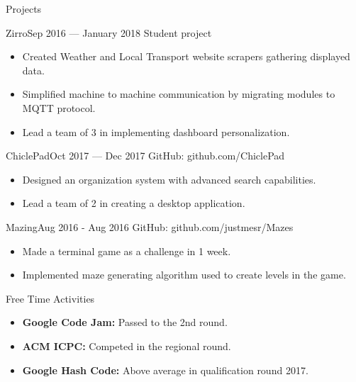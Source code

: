\documentclass[]{style}
\begin{document}
	\begin{cvsection}{Projects}
		\begin{cvsubsection}{Zirro}{}{Sep 2016 — January 2018}
			Student project
			\begin{itemize}
				\item Created Weather and Local Transport website scrapers gathering displayed data.
				\item Simplified machine to machine communication by migrating modules to MQTT protocol.
				\item Lead a team of 3 in implementing dashboard personalization.
			\end{itemize}
		\end{cvsubsection}

		\begin{cvsubsection}{ChiclePad}{}{Oct 2017 — Dec 2017}
			GitHub: github.com/ChiclePad
			\begin{itemize}
				\item Designed an organization system with advanced search capabilities.
				\item Lead a team of 2 in creating a desktop application.
			\end{itemize}
		\end{cvsubsection}

		\begin{cvsubsection}{Mazing}{}{Aug 2016 - Aug 2016}
			GitHub: github.com/justmesr/Mazes
			\begin{itemize}
				\item Made a terminal game as a challenge in 1 week.
				\item Implemented maze generating algorithm used to create levels in the game. 
			\end{itemize}
		\end{cvsubsection}
	\end{cvsection}
	
	\begin{cvsection}{Free Time Activities}
		\begin{cvsubsection}{}{}{}	
			\begin{itemize}
				\item \textbf{Google Code Jam:} Passed to the 2nd round.
                \item \textbf{ACM ICPC:} Competed in the regional round.
                \item \textbf{Google Hash Code:} Above average in qualification round 2017.
			\end{itemize}
		\end{cvsubsection}
	\end{cvsection}
	
\end{document}
